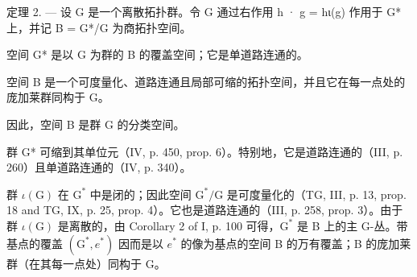 定理 2. --- 设 G 是一个离散拓扑群。令 G 通过右作用 h · g = hι(g) 作用于 G* 上，并记 B = G*/G 为商拓扑空间。

空间 G* 是以 G 为群的 B 的覆盖空间；它是单道路连通的。

空间 B 是一个可度量化、道路连通且局部可缩的拓扑空间，并且它在每一点处的庞加莱群同构于 G。

因此，空间 B 是群 G 的分类空间。

群 G* 可缩到其单位元（IV, p. 450, prop. 6）。特别地，它是道路连通的（III, p. 260）且单道路连通的（IV, p. 340）。

群 \(\iota(\mathrm{G})\) 在 \(\mathrm{G}^*\) 中是闭的；因此空间 \(\mathrm{G}^*/\mathrm{G}\) 是可度量化的（TG, III, p. 13, prop. 18 and TG, IX, p. 25, prop. 4）。它也是道路连通的（III, p. 258, prop. 3）。由于群 \(\iota(\mathrm{G})\) 是离散的，由 Corollary 2 of I, p. 100 可得，\(\mathrm{G}^*\) 是 B 上的主 G-丛。带基点的覆盖 \((\mathrm{G}^*, e^*)\) 因而是以 \(e^*\) 的像为基点的空间 B 的万有覆盖；B 的庞加莱群（在其每一点处）同构于 G。

